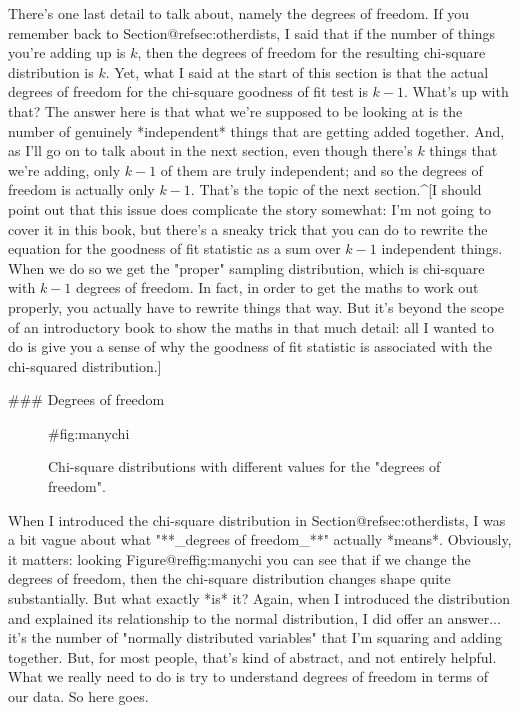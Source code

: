 There's one last detail to talk about, namely the degrees of freedom. If you remember back to Section@refsec:otherdists, I said that if the number of things you're adding up is $k$, then the degrees of freedom for the resulting chi-square distribution is $k$. Yet, what I said at the start of this section is that the actual degrees of freedom for the chi-square goodness of fit test is $k-1$. What's up with that? The answer here is that what we're supposed to be looking at is the number of genuinely *independent* things that are getting added together. And, as I'll go on to talk about in the next section, even though there's $k$ things that we're adding, only $k-1$ of them are truly independent; and so the degrees of freedom is actually only $k-1$. That's the topic of the next section.^[I should point out that this issue does complicate the story somewhat: I'm not going to cover it in this book, but there's a sneaky trick that you can do to rewrite the equation for the goodness of fit statistic as a sum over $k-1$ independent things. When we do so we get the "proper" sampling distribution, which is chi-square with $k-1$ degrees of freedom. In fact, in order to get the maths to work out properly, you actually have to rewrite things that way. But it's beyond the scope of an introductory book to show the maths in that much detail: all I wanted to do is give you a sense of why the goodness of fit statistic is associated with the chi-squared distribution.]


### Degrees of freedom

\begin{figure}
\begin{center}
\caption{Chi-square distributions with different values for the "degrees of freedom".}
{#fig:manychi}
\HR
\end{center}
\end{figure}

When I introduced the chi-square distribution in Section@refsec:otherdists, I was a bit vague about what "**_degrees of freedom_**" actually *means*. Obviously, it matters: looking Figure@reffig:manychi you can see that if we change the degrees of freedom, then the chi-square distribution changes shape quite substantially. But what exactly *is* it? Again, when I introduced the distribution and explained its relationship to the normal distribution, I did offer an answer... it's the number of "normally distributed variables" that I'm squaring and adding together. But, for most people, that's kind of abstract, and not entirely helpful. What we really need to do is try to understand degrees of freedom in terms of our data. So here goes.

